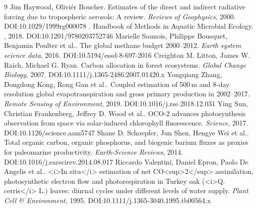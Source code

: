\documentclass[11pt]{article}
\begin{document}
\begin{thebibliography}{9}
 Jim Haywood, Oliviér Boucher. Estimates of the direct and indirect radiative forcing due to tropospheric aerosols: A review. \emph{Reviews of Geophysics}, 2000. DOI:10.1029/1999rg000078
 . Handbook of Methods in Aquatic Microbial Ecology. \emph{}, 2018. DOI:10.1201/9780203752746
 Marielle Saunois, Philippe Bousquet, Benjamin Poulter et al.. The global methane budget 2000–2012. \emph{Earth system science data}, 2016. DOI:10.5194/essd-8-697-2016
 Creighton M. Litton, James W. Raich, Michael G. Ryan. Carbon allocation in forest ecosystems. \emph{Global Change Biology}, 2007. DOI:10.1111/j.1365-2486.2007.01420.x
 Yongqiang Zhang, Dongdong Kong, Rong Gan et al.. Coupled estimation of 500 m and 8-day resolution global evapotranspiration and gross primary production in 2002–2017. \emph{Remote Sensing of Environment}, 2019. DOI:10.1016/j.rse.2018.12.031
 Ying Sun, Christian Frankenberg, Jeffrey D. Wood et al.. OCO-2 advances photosynthesis observation from space via solar-induced chlorophyll fluorescence. \emph{Science}, 2017. DOI:10.1126/science.aam5747
 Shane D. Schoepfer, Jun Shen, Hengye Wei et al.. Total organic carbon, organic phosphorus, and biogenic barium fluxes as proxies for paleomarine productivity. \emph{Earth-Science Reviews}, 2014. DOI:10.1016/j.earscirev.2014.08.017
 Riccardo Valentini, Daniel Epron, Paolo De Angelis et al.. <i>In situ</i> estimation of net CO<sup>2</sup> assimilation, photosynthetic electron flow and photorespiration in Turkey oak (<i>Q. cerris</i> L.) leaves: diurnal cycles under different levels of water supply. \emph{Plant Cell \& Environment}, 1995. DOI:10.1111/j.1365-3040.1995.tb00564.x
\end{thebibliography}
\end{document}
